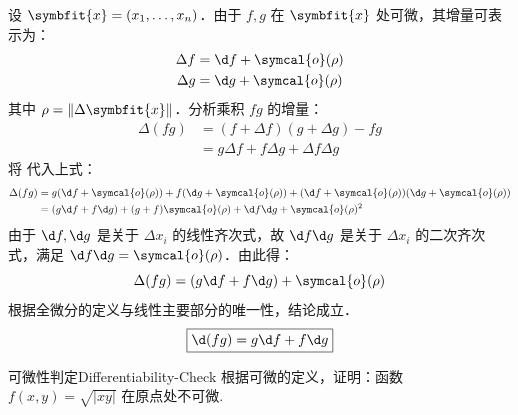 \begin{myproof}
    设 $\symbfit{x} = (x_1, \dots, x_n)$．由于 $f, g$ 在 $\symbfit{x}$ 处可微，其增量可表示为：
    \begin{equation}
        \label{eq:inc-fg}
        \begin{aligned}
            \Delta f & = \d f + \symcal{o}(\rho) \\
            \Delta g & = \d g + \symcal{o}(\rho)
        \end{aligned}
    \end{equation}
    其中 $\rho = \|\Delta \symbfit{x}\|$．分析乘积 $fg$ 的增量：
    \begin{equation}
        \begin{aligned}
            \Delta(fg) & = (f + \Delta f)(g + \Delta g) - fg           \\
                       & = g \Delta f + f \Delta g + \Delta f \Delta g
        \end{aligned}
    \end{equation}
    将  代入上式：
    \begin{equation}
        \begin{aligned}
            \Delta(fg) & = g (\d f + \symcal{o}(\rho)) + f (\d g + \symcal{o}(\rho)) + (\d f + \symcal{o}(\rho))(\d g + \symcal{o}(\rho)) \\
                       & = (g \d f + f \d g) + (g + f) \symcal{o}(\rho) + \d f \d g + \symcal{o}(\rho)^2
        \end{aligned}
    \end{equation}
    由于 $\d f, \d g$ 是关于 $\Delta x_i$ 的线性齐次式，故 $\d f \d g$ 是关于 $\Delta x_i$ 的二次齐次式，满足 $\d f \d g = \symcal{o}(\rho)$．由此得：
    \begin{equation}
        \Delta(fg) = (g \d f + f \d g) + \symcal{o}(\rho)
    \end{equation}
    根据全微分的定义与线性主要部分的唯一性，结论成立．
    \begin{equation}
        \boxed{\d(fg) = g \d f + f \d g}
    \end{equation}
\end{myproof}

\begin{problem}{可微性判定}{Differentiability-Check}
    根据可微的定义，证明：函数 $f(x, y) = \sqrt{|xy|}$ 在原点处不可微.
\end{problem}

